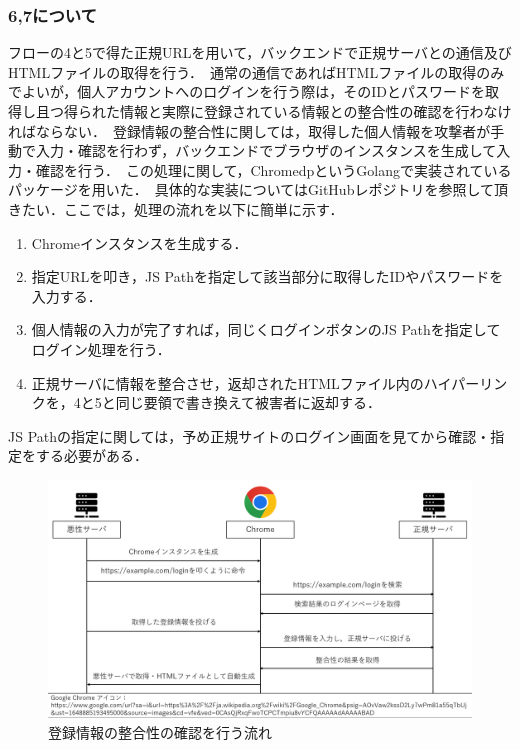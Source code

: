 \documentclass[dvipdfmx]{jsarticle}
\begin{document}
        \subsubsection{6,7について}
            フローの4と5で得た正規URLを用いて，バックエンドで正規サーバとの通信及びHTMLファイルの取得を行う．\
            通常の通信であればHTMLファイルの取得のみでよいが，個人アカウントへのログインを行う際は，そのIDとパスワードを取得し且つ得られた情報と実際に登録されている情報との整合性の確認を行わなければならない．\
            登録情報の整合性に関しては，取得した個人情報を攻撃者が手動で入力・確認を行わず，バックエンドでブラウザのインスタンスを生成して入力・確認を行う．\
            この処理に関して，ChromedpというGolangで実装されているパッケージを用いた．\
            具体的な実装についてはGitHubレポジトリを参照して頂きたい．ここでは，処理の流れを以下に簡単に示す．
            \begin{enumerate}
                \item Chromeインスタンスを生成する．
                \item 指定URLを叩き，JS Pathを指定して該当部分に取得したIDやパスワードを入力する．
                \item 個人情報の入力が完了すれば，同じくログインボタンのJS Pathを指定してログイン処理を行う．
                \item 正規サーバに情報を整合させ，返却されたHTMLファイル内のハイパーリンクを，4と5と同じ要領で書き換えて被害者に返却する．
            \end{enumerate}
            JS Pathの指定に関しては，予め正規サイトのログイン画面を見てから確認・指定をする必要がある．
            \begin{figure}
                \centering
                \includegraphics[width=15cm]{img/vc-vf-6-7.png}
                \caption{登録情報の整合性の確認を行う流れ}
                \label{flow-6-7}
            \end{figure}
            \clearpage
\end{document}
